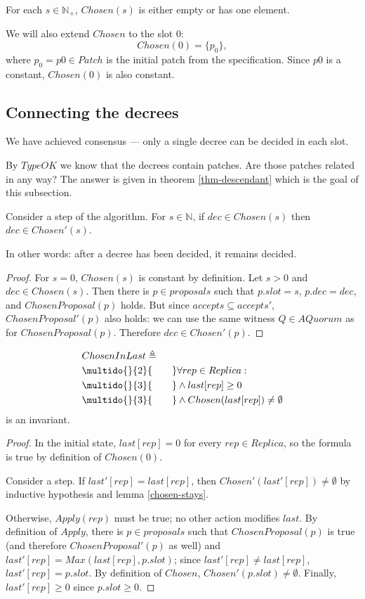 \documentclass[12pt,a4paper,en]{pracamgr}
\newcommand{\mbb}[1]{\mathbb{#1}}
\newcommand{\ind}[1]{\multido{}{#1}{\qquad}}
\begin{document}
\begin{coro}[Consensus]\label{consensus}
    For each $s \in \mbb N_+$, $Chosen(s)$ is either empty or has one element.
\end{coro}

We will also extend $Chosen$ to the slot $0$:
$$ Chosen(0) = \{p_0\}, $$
where $p_0 = p0 \in Patch$ is the initial patch from the specification. Since $p0$ is a constant, $Chosen(0)$ is also constant.

\subsection{Connecting the decrees}

We have achieved consensus --- only a single decree can be decided in each slot.

By $TypeOK$ we know that the decrees contain patches. Are those patches related in any way? The answer is given in theorem \ref{thm-descendant} which is the goal of this subsection.

\begin{lemma}\label{chosen-stays}
    Consider a step of the algorithm. For $s \in \mbb N$, if $dec \in Chosen(s)$ then $dec \in Chosen'(s)$.
\end{lemma}
In other words: after a decree has been decided, it remains decided.
\begin{proof}
    For $s = 0$, $Chosen(s)$ is constant by definition. Let $s > 0$ and $dec \in Chosen(s)$. Then there is $p \in proposals$ such that $p.slot = s$, $p.dec = dec$, and $ChosenProposal(p)$ holds. But since $accepts \subseteq accepts'$, $ChosenProposal'(p)$ also holds: we can use the same witness $Q \in AQuorum$ as for $ChosenProposal(p)$. Therefore $dec \in Chosen'(p)$.
\end{proof}

\begin{lemma}
    \begin{align*}
        & ChosenInLast \triangleq\\
        & \ind{2} \forall rep \in Replica:\\
        & \ind{3} \land last[rep] \ge 0\\
        & \ind{3} \land Chosen(last[rep]) \neq \emptyset
    \end{align*}
    is an invariant.
\end{lemma}
\begin{proof}
    In the initial state, $last[rep] = 0$ for every $rep \in Replica$, so the formula is true by definition of $Chosen(0)$.

    Consider a step. If $last'[rep] = last[rep]$, then $Chosen'(last'[rep]) \neq \emptyset$ by inductive hypothesis and lemma \ref{chosen-stays}.

    Otherwise, $Apply(rep)$ must be true; no other action modifies $last$. By definition of $Apply$, there is $p \in proposals$ such that $ChosenProposal(p)$ is true (and therefore $ChosenProposal'(p)$ as well) and $last'[rep] = Max(last[rep], p.slot)$; since $last'[rep] \neq last[rep]$, $last'[rep] = p.slot$. By definition of $Chosen$, $Chosen'(p.slot) \neq \emptyset$. Finally, $last'[rep] \ge 0$ since $p.slot \ge 0$.
\end{proof}
\end{document}
